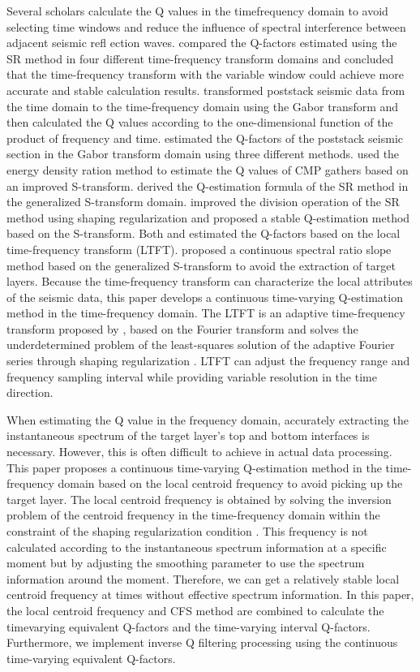 Several scholars calculate the Q values in the timefrequency domain to
avoid selecting time windows and reduce the influence of spectral
interference between adjacent seismic refl ection
waves. \cite{Reine09} compared the Q-factors estimated using the SR
method in four different time-frequency transform domains and
concluded that the time-frequency transform with the variable window
could achieve more accurate and stable calculation results.
\cite{Wang04} transformed poststack seismic data from the time domain
to the time-frequency domain using the Gabor transform and then
calculated the Q values according to the one-dimensional function of
the product of frequency and time. \cite{Lupinacci15} estimated the
Q-factors of the poststack seismic section in the Gabor transform
domain using three different methods.  \cite{An15} used the energy
density ration method to estimate the Q values of CMP gathers based on
an improved S-transform. \cite{Hao16} derived the Q-estimation formula
of the SR method in the generalized S-transform domain.  \cite{Liu11}
improved the division operation of the SR method using shaping
regularization and proposed a stable Q-estimation method based on the
S-transform. Both \cite{Liu16a} and \cite{Liu16b} estimated the
Q-factors based on the local time-frequency transform
(LTFT). \cite{Wu18} proposed a continuous spectral ratio slope method
based on the generalized S-transform to avoid the extraction of target
layers. Because the time-frequency transform can characterize the
local attributes of the seismic data, this paper develops a continuous
time-varying Q-estimation method in the time-frequency domain. The
LTFT is an adaptive time-frequency transform proposed by \cite{Liu13},
based on the Fourier transform and solves the underdetermined problem
of the least-squares solution of the adaptive Fourier series through
shaping regularization \cite[]{Fomel07b}. LTFT can adjust the
frequency range and frequency sampling interval while providing
variable resolution in the time direction.

When estimating the Q value in the frequency domain, accurately
extracting the instantaneous spectrum of the target layer’s top and
bottom interfaces is necessary. However, this is often difficult to
achieve in actual data processing. This paper proposes a continuous
time-varying Q-estimation method in the time-frequency domain based on
the local centroid frequency to avoid picking up the target layer. The
local centroid frequency is obtained by solving the inversion problem
of the centroid frequency in the time-frequency domain within the
constraint of the shaping regularization condition
\cite[]{Fomel07b}. This frequency is not calculated according to the
instantaneous spectrum information at a specific moment but by
adjusting the smoothing parameter to use the spectrum information
around the moment.  Therefore, we can get a relatively stable local
centroid frequency at times without effective spectrum information. In
this paper, the local centroid frequency and CFS method are combined
to calculate the timevarying equivalent Q-factors and the time-varying
interval Q-factors. Furthermore, we implement inverse Q filtering
processing \cite[]{Wang02, Wang06} using the continuous time-varying
equivalent Q-factors.

